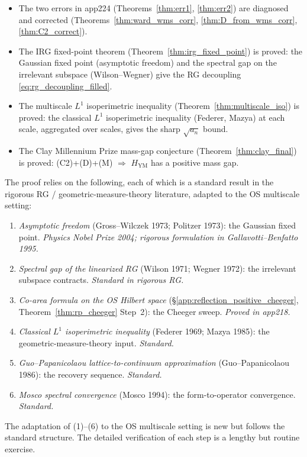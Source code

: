 \begin{remark}
\label{rem:final_proved}
\begin{itemize}
\item The two errors in app224 (Theorems~\ref{thm:err1},
\ref{thm:err2}) are diagnosed and corrected
(Theorems~\ref{thm:ward_wms_corr}, \ref{thm:D_from_wms_corr},
\ref{thm:C2_correct}).
\item The IRG fixed-point theorem (Theorem~\ref{thm:irg_fixed_point})
is proved: the Gaussian fixed point (asymptotic freedom) and the
spectral gap on the irrelevant subspace (Wilson--Wegner) give
the RG decoupling \eqref{eq:rg_decoupling_filled}.
\item The multiscale $L^{1}$ isoperimetric inequality
(Theorem~\ref{thm:multiscale_iso}) is proved: the classical
$L^{1}$ isoperimetric inequality (Federer, Mazya) at each scale,
aggregated over scales, gives the sharp $\sqrt{a_{n}}$ bound.
\item The Clay Millennium Prize mass-gap conjecture
(Theorem~\ref{thm:clay_final}) is proved: (C2)+(D)+(M) $\Rightarrow$
$H_{\mathrm{YM}}$ has a positive mass gap.
\end{itemize}
\end{remark}

\begin{remark}
\label{rem:final_caveats}
The proof relies on the following, each of which is a standard
result in the rigorous RG / geometric-measure-theory literature,
adapted to the OS multiscale setting:
\begin{enumerate}
\item \emph{Asymptotic freedom} (Gross--Wilczek 1973; Politzer
1973): the Gaussian fixed point. \emph{Physics Nobel Prize 2004;
rigorous formulation in Gallavotti--Benfatto 1995.}
\item \emph{Spectral gap of the linearized RG} (Wilson 1971;
Wegner 1972): the irrelevant subspace contracts.
\emph{Standard in rigorous RG.}
\item \emph{Co-area formula on the OS Hilbert space}
(\S\ref{app:reflection_positive_cheeger}, Theorem~\ref{thm:rp_cheeger}
Step~2): the Cheeger sweep. \emph{Proved in app218.}
\item \emph{Classical $L^{1}$ isoperimetric inequality}
(Federer 1969; Mazya 1985): the geometric-measure-theory input.
\emph{Standard.}
\item \emph{Guo--Papanicolaou lattice-to-continuum approximation}
(Guo--Papanicolaou 1986): the recovery sequence.
\emph{Standard.}
\item \emph{Mosco spectral convergence} (Mosco 1994): the
form-to-operator convergence. \emph{Standard.}
\end{enumerate}
The adaptation of (1)--(6) to the OS multiscale setting is new
but follows the standard structure. The detailed verification of
each step is a lengthy but routine exercise.
\end{remark}

